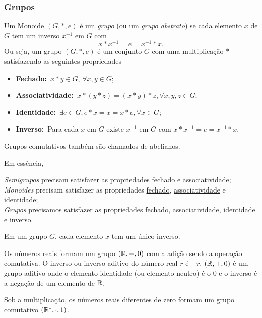 \subsubsection{Grupos}
\begin{definition}
  Um Monoide $(G,* , e)$ é um \emph{grupo} (ou um \emph{grupo abstrato}) se cada elemento $x$ de $G$ tem um inverso $x^{-1}$ em $G$ com $$x* x^{-1} = e = x^{-1} * x.$$
  Ou seja, um grupo $(G,* , e)$ é um conjunto $G$ com uma multiplicação $*$ satisfazendo as seguintes propriedades
  \begin{itemize}
    \item \textbf{Fechado:}\ $x* y \in G$, $\forall x,y \in G$;
    \item \textbf{Associatividade:}\ $x * (y* z) = (x* y) * z, \forall x,y,z \in G$;
    \item \textbf{Identidade:}\ $\exists e \in G; e* x = x = x* e, \forall x \in G$;
    \item \textbf{Inverso:}\ Para cada $x$ em $G$ existe $x^{-1}$ em $G$ com $x* x^{-1} = e = x^{-1} * x$.
  \end{itemize}
  Grupos comutativos também são chamados de abelianos.
\end{definition}
Em essência, 

\emph{Semigrupos} precisam satisfazer as propriedades \underline{fechado} e \underline{associatividade};\\ 
\emph{Monoides} precisam satisfazer as propriedades \underline{fechado}, \underline{associatividade} e \underline{identidade};\\
\emph{Grupos} precisamos satisfazer as propriedades \underline{fechado}, \underline{associatividade}, \underline{identidade} e \underline{inverso}.

\begin{stat}
  Em um grupo $G$, cada elemento $x$ tem um único inverso.
\end{stat}
\begin{exmp}
  Os números reais formam um grupo $(\mathbb{R},+,0)$ com a adição sendo a operação comutativa. O inverso ou inverso aditivo do número real $r$ é $-r$. $(\mathbb{R},+,0)$ é um grupo aditivo onde o elemento identidade (ou elemento neutro) é o $0$ e o inverso é a negação de um elemento de $\mathbb{R}$.
\end{exmp}
\begin{exmp}\label{NOTR}
  Sob a multiplicação, os números reais diferentes de zero formam um grupo comutativo $(\mathbb{R}^{*},\cdot , 1)$.
\end{exmp}

